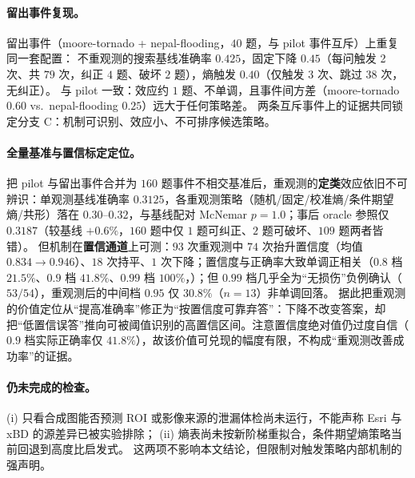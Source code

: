 \paragraph{留出事件复现。}
留出事件（moore-tornado + nepal-flooding，$40$ 题，与 pilot 事件互斥）上重复同一套配置：
不重观测的搜索基线准确率 $0.425$，固定下降 $0.45$（每问触发 2 次、共 $79$ 次，纠正 $4$ 题、破坏 $2$ 题），熵触发 $0.40$（仅触发 $3$ 次、跳过 $38$ 次，无纠正）。
与 pilot 一致：效应约 $1$ 题、不单调，且事件间方差（moore-tornado $0.60$ vs.\ nepal-flooding $0.25$）远大于任何策略差。
两条互斥事件上的证据共同锁定分支 C：机制可识别、效应小、不可排序候选策略。

\paragraph{全量基准与置信标定定位。}
把 pilot 与留出事件合并为 $160$ 题事件不相交基准后，重观测的\textbf{定类}效应依旧不可辨识：单观测基线准确率 $0.3125$，各重观测策略（随机/固定/校准熵/条件期望熵/共形）落在 $0.30$--$0.32$，与基线配对 McNemar $p=1.0$；事后 oracle 参照仅 $0.3187$（较基线 $+0.6\%$，$160$ 题中仅 $1$ 题可纠正、$2$ 题可破坏、$109$ 题两者皆错）。
但机制在\textbf{置信通道}上可测：$93$ 次重观测中 $74$ 次抬升置信度（均值 $0.834\to0.946$）、$18$ 次持平、$1$ 次下降；置信度与正确率大致单调正相关（$0.8$ 档 $21.5\%$、$0.9$ 档 $41.8\%$、$0.99$ 档 $100\%$，）；但 $0.99$ 档几乎全为``无损伤''负例确认（$53/54$），重观测后的中间档 $0.95$ 仅 $30.8\%$（$n=13$）非单调回落。
据此把重观测的价值定位从``提高准确率''修正为``按置信度可靠弃答''：下降不改变答案，却把``低置信误答''推向可被阈值识别的高置信区间。注意置信度绝对值仍过度自信（$0.9$ 档实际正确率仅 $41.8\%$），故该价值可兑现的幅度有限，不构成``重观测改善成功率''的证据。

\begin{table}[htbp]
\centering
\small
\caption{重观测的置信标定（$160$ 题事件不相交基准）。置信度与正确率大致单调正相关；重观测在 $93$ 次中 $74$ 次抬升置信度（均值 $0.834\to0.946$）。高置信尾（conf$\ge$0.9）上共形重观测（A4）正确率高于单观测（A0）。}
\label{tab:confcal}

\end{table}

\paragraph{仍未完成的检查。}
(i) 只看合成图能否预测 ROI 或影像来源的泄漏体检尚未运行，不能声称 Esri 与 xBD 的源差异已被实验排除；
(ii) 熵表尚未按新阶梯重拟合，条件期望熵策略当前回退到高度比启发式。
这两项不影响本文结论，但限制对触发策略内部机制的强声明。

